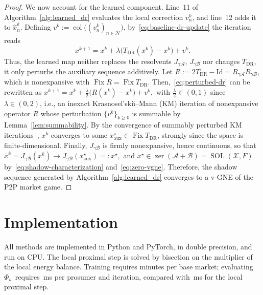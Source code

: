 \documentclass[final]{l4dc2026}
\begin{document}
\begin{proof}
We now account for the learned component. Line~11 of Algorithm~\ref{alg:learned_dr} evaluates the local correction $v_n^k$, and line~12 adds it to $\hat x_n^k$. Defining $v^k:=\operatorname{col}\big((v_n^k)_{n\in\mathcal N}\big)$, by~\eqref{eq:baseline-dr-update} the iteration reads
\begin{equation}
    x^{k+1}
    =
    x^k
    +
    \lambda
    \big(
        T_{\mathrm{DR}}(x^k)-x^k
    \big)
    +
    v^k.
    \label{eq:perturbed-dr}
\end{equation}
Thus, the learned map neither replaces the resolvents $J_{\gamma\mathcal A}$, $J_{\gamma\mathcal B}$ nor changes $T_{\mathrm{DR}}$, it only perturbs the auxiliary sequence additively. Let $R:=2T_{\mathrm{DR}}-\mathrm{Id}=R_{\gamma\mathcal A}R_{\gamma\mathcal B}$, which is nonexpansive with $\operatorname{Fix}R=\operatorname{Fix}T_{\mathrm{DR}}$. Then,~\eqref{eq:perturbed-dr} can be rewritten as
$
    x^{k+1}
    =
    x^k
    +
    \tfrac{\lambda}{2}
    \big(
        R(x^k)-x^k
    \big)
    +
    v^k,
$
with $\tfrac{\lambda}{2}\in(0,1)$ since $\lambda\in(0,2)$, i.e., an inexact Krasnosel'ski\u{\i}--Mann (KM) iteration of nonexpansive operator $R$ whose perturbation $\{v^k\}_{k\geq0}$ is summable by Lemma~\ref{lem:summability}. By the convergence of summably perturbed KM iterations~\citep[Prop.~3]{martin_learning_2026}, $x^k$ converges to some $x_{\mathrm{aux}}^\star\in\operatorname{Fix}T_{\mathrm{DR}}$, strongly since the space is finite-dimensional. Finally, $J_{\gamma\mathcal B}$ is firmly nonexpansive, hence continuous, so that
$
    \bar x^k
    =
    J_{\gamma\mathcal B}(x^k)
    \to
    J_{\gamma\mathcal B}(x_{\mathrm{aux}}^\star)
    =:
    x^\star,
$
and $x^\star\in\operatorname{zer}(\mathcal A+\mathcal B)=\operatorname{SOL}(\mathcal X,F)$ by~\eqref{eq:shadow-characterization} and~\eqref{eq:zero-vgne}. Therefore, the shadow sequence generated by Algorithm~\ref{alg:learned_dr} converges to a v-GNE of the P2P market game.

 \end{proof}



\section{Implementation}
\label{app:impl}
All methods are implemented in Python and PyTorch, in double precision, and
run on CPU. The local proximal step is solved by bisection on the
multiplier of the local energy balance. Training requires \TBD{$\cdot$}
minutes per base market; evaluating $\Phi_w$ requires \TBD{$\cdot$}\,ms
per prosumer and iteration, compared with \TBD{$\cdot$}\,ms for the local
proximal step.
\end{document}
